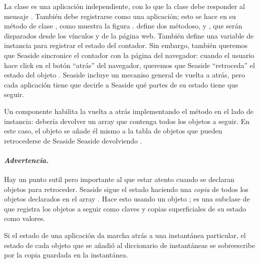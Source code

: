 \documentclass[a4paper,10pt,twoside]{book}
\begin{document}
La clase  es una aplicación independiente, con lo que la clase  debe responder  al mensaje .
También debe registrarse como una aplicación; esto se hace en su método de clase , como muestra la figura .
 define dos métodoso,  y , que serán disparados desde los vínculos \link{++} y \link{--\,--} de la página web.
También define una variable de instancia  para registrar el estado del contador.
Sin embargo, también queremos que Seaside sincronice el contador con la página del navegador: cuando el usuario hace click en el botón ``atrás'' del navegador, queremos que Seaside ``retroceda'' el estado del objeto .
Seaside incluye un mecaniso general de vuelta a atrás, pero cada aplicación tiene que decirle a Seaside qué partes de su estado tiene que seguir.

Un componente habilita la vuelta a atrás implementando el método  en el lado de instancia:
 debería devolver un array que contenga todos los objetos a seguir.
En este caso, el objeto  se añade él mismo a la tabla de objetos que pueden retrocederse de Seaside Seaside devolviendo .

\paragraph{\emph{Advertencia.}}
Hay un punto sutil pero importante al que estar atento cuando se declaran objetos para retroceder.
Seaside sigue el estado haciendo una \emph{copia} de todos los objetos declarados en el array .
Hace esto usando un objeto ;  es una subclase de  que registra los objetos a seguir como claves y copias superficiales de su estado como valores.

Si el estado de una aplicación da marcha atrás a una instantánea particular, el estado de cada objeto que se añadió al diccionario de instantáneas se sobreescribe por la copia guardada en la instantánea. 
\end{document}
